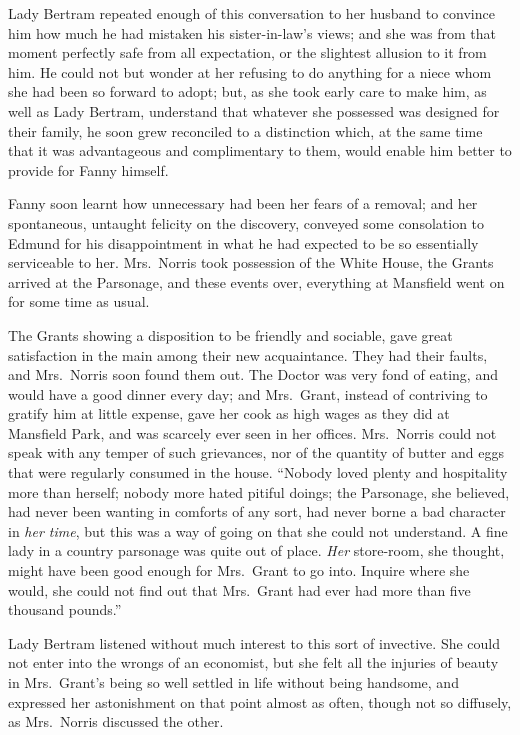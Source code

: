 \documentclass{article}
\begin{document}
Lady Bertram repeated enough of this conversation
to her husband to convince him how much he had mistaken
his sister-in-law's views; and she was from that moment
perfectly safe from all expectation, or the slightest
allusion to it from him.  He could not but wonder at her
refusing to do anything for a niece whom she had been so
forward to adopt; but, as she took early care to make him,
as well as Lady Bertram, understand that whatever she
possessed was designed for their family, he soon grew
reconciled to a distinction which, at the same time
that it was advantageous and complimentary to them,
would enable him better to provide for Fanny himself.

Fanny soon learnt how unnecessary had been her fears of a removal;
and her spontaneous, untaught felicity on the discovery,
conveyed some consolation to Edmund for his disappointment
in what he had expected to be so essentially serviceable
to her.  Mrs.\ Norris took possession of the White House,
the Grants arrived at the Parsonage, and these events over,
everything at Mansfield went on for some time as usual.

The Grants showing a disposition to be friendly and sociable,
gave great satisfaction in the main among their new acquaintance.
They had their faults, and Mrs.\ Norris soon found them out.
The Doctor was very fond of eating, and would have a good
dinner every day; and Mrs.\ Grant, instead of contriving
to gratify him at little expense, gave her cook as high
wages as they did at Mansfield Park, and was scarcely ever
seen in her offices.  Mrs.\ Norris could not speak with any
temper of such grievances, nor of the quantity of butter
and eggs that were regularly consumed in the house.
``Nobody loved plenty and hospitality more than herself;
nobody more hated pitiful doings; the Parsonage,
she believed, had never been wanting in comforts of any sort,
had never borne a bad character in \emph{her time}, but this
was a way of going on that she could not understand.
A fine lady in a country parsonage was quite out of place.
\emph{Her} store-room, she thought, might have been good enough
for Mrs.\ Grant to go into.  Inquire where she would,
she could not find out that Mrs.\ Grant had ever had more
than five thousand pounds.''

Lady Bertram listened without much interest to this
sort of invective.  She could not enter into the wrongs
of an economist, but she felt all the injuries of beauty
in Mrs.\ Grant's being so well settled in life without
being handsome, and expressed her astonishment on
that point almost as often, though not so diffusely,
as Mrs.\ Norris discussed the other.
\end{document}
